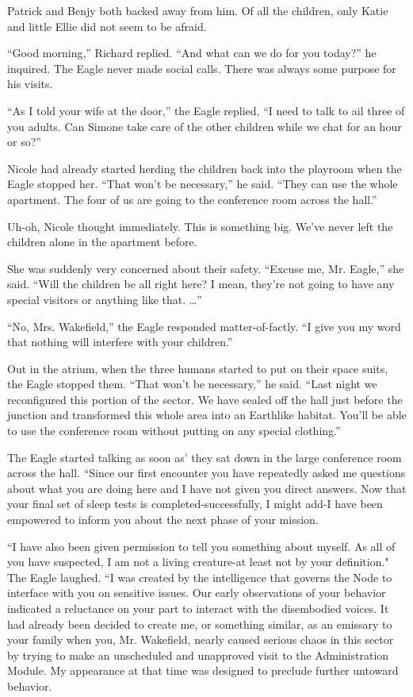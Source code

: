 \documentclass[]{article}
\begin{document}
{Patrick and Benjy both backed away from him.  Of all the children, only Katie and little Ellie did not seem to be afraid.

“Good morning,” Richard replied.  “And what can we do for you today?” he inquired.  The Eagle never made social calls.  There was always some purpose for his visits.

“As I told your wife at the door,” the Eagle replied, “I need to talk to ail three of you adults.  Can Simone take care of the other children while we chat for an hour or so?”

Nicole had already started herding the children back into the playroom when the Eagle stopped her.  “That won’t be necessary,” he said.  “They can use the whole apartment.  The four of us are going to the conference room across the hall.”

Uh-oh, Nicole thought immediately.  This is something big.  We’ve never left the children alone in the apartment before.

She was suddenly very concerned about their safety.  “Excuse me, Mr.  Eagle,” she said.  “Will the children be all right here? I mean, they’re not going to have any special visitors or anything like that.  …”

“No, Mrs.  Wakefield,” the Eagle responded matter-of-factly.  “I give you my word that nothing will interfere with your children.”

Out in the atrium, when the three humans started to put on their space suits, the Eagle stopped them.  “That won’t be necessary,” he said.  “Last night we reconfigured this portion of the sector.  We have sealed off the hall just before the junction and transformed this whole area into an Earthlike habitat.  You’ll be able to use the conference room without putting on any special clothing.”

The Eagle started talking as soon as’ they sat down in the large conference room across the hall.  “Since our first encounter you have repeatedly asked me questions about what you are doing here and I have not given you direct answers.  Now that your final set of sleep tests is completed-successfully, I might add-I have been empowered to inform you about the next phase of your mission.

“I have also been given permission to tell you something about myself.  As all of you have suspected, I am not a living creature-at least not by your definition."  The Eagle laughed.  “I was created by the intelligence that governs the Node to interface with you on sensitive issues.  Our early observations of your behavior indicated a reluctance on your part to interact with the disembodied voices.  It had already been decided to create me, or something similar, as an emissary to your family when you, Mr.  Wakefield, nearly caused serious chaos in this sector by trying to make an unscheduled and unapproved visit to the Administration Module.  My appearance at that time was designed to preclude further untoward behavior.

}
\end{document}
